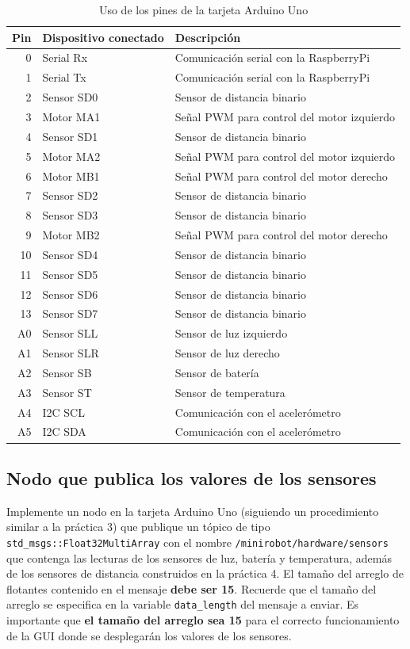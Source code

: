 \documentclass[a4paper,12pt]{article}
\begin{document}
\begin{table}
\centering
\begin{tabular}{rll}
\hline
Pin & Dispositivo conectado & Descripción\\
\hline
0 & Serial Rx  & Comunicación serial con la RaspberryPi\\
1 & Serial Tx  & Comunicación serial con la RaspberryPi\\
2 & Sensor SD0 & Sensor de distancia binario\\
3 & Motor MA1  & Señal PWM para control del motor izquierdo\\
4 & Sensor SD1 & Sensor de distancia binario\\
5 & Motor MA2  & Señal PWM para control del motor izquierdo\\
6 & Motor MB1  & Señal PWM para control del motor derecho\\
7 & Sensor SD2 & Sensor de distancia binario\\
8 & Sensor SD3 & Sensor de distancia binario\\
9 & Motor MB2  & Señal PWM para control del motor derecho\\
10& Sensor SD4 & Sensor de distancia binario\\
11& Sensor SD5 & Sensor de distancia binario\\
12& Sensor SD6 & Sensor de distancia binario\\
13& Sensor SD7 & Sensor de distancia binario\\
A0& Sensor SLL & Sensor de luz izquierdo\\
A1& Sensor SLR & Sensor de luz derecho\\
A2& Sensor SB  & Sensor de batería\\
A3& Sensor ST  & Sensor de temperatura\\
A4& I2C SCL    & Comunicación con el acelerómetro\\
A5& I2C SDA    & Comunicación con el acelerómetro\\
\hline
\end{tabular}
\caption{Uso de los pines de la tarjeta Arduino Uno}
\label{tab:PinUsage}
\end{table}

\subsection{Nodo que publica los valores de los sensores}
Implemente un nodo en la tarjeta Arduino Uno (siguiendo un procedimiento similar a la práctica 3) que publique un tópico de tipo \texttt{std\_msgs::Float32MultiArray} con el nombre \texttt{/minirobot/hardware/sensors} que contenga las lecturas de los sensores de luz, batería y temperatura, además de los sensores de distancia construidos en la práctica 4. El tamaño del arreglo de flotantes contenido en el mensaje \textbf{debe ser 15}. Recuerde que el tamaño del arreglo se especifica en la variable \texttt{data\_length} del mensaje a enviar. Es importante que \textbf{el tamaño del arreglo sea 15} para el correcto funcionamiento de la GUI donde se desplegarán los valores de los sensores. 
\end{document}
